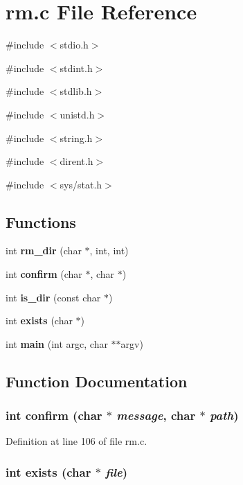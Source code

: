 \section{rm.c File Reference}
\label{rm_8c}
{\ttfamily \#include $<$stdio.h$>$}\par
{\ttfamily \#include $<$stdint.h$>$}\par
{\ttfamily \#include $<$stdlib.h$>$}\par
{\ttfamily \#include $<$unistd.h$>$}\par
{\ttfamily \#include $<$string.h$>$}\par
{\ttfamily \#include $<$dirent.h$>$}\par
{\ttfamily \#include $<$sys/stat.h$>$}\par
\subsection*{Functions}
\begin{DoxyCompactItemize}
\item 
int {\bf rm\_\-dir} (char $\ast$, int, int)
\item 
int {\bf confirm} (char $\ast$, char $\ast$)
\item 
int {\bf is\_\-dir} (const char $\ast$)
\item 
int {\bf exists} (char $\ast$)
\item 
int {\bf main} (int argc, char $\ast$$\ast$argv)
\end{DoxyCompactItemize}


\subsection{Function Documentation}
\subsubsection[{confirm}]{\setlength{\rightskip}{0pt plus 5cm}int confirm (char $\ast$ {\em message}, \/  char $\ast$ {\em path})}\label{rm_8c_a9ef1dd18b9d9e57d2ca84b42718b979e}


Definition at line 106 of file rm.c.

\subsubsection[{exists}]{\setlength{\rightskip}{0pt plus 5cm}int exists (char $\ast$ {\em file})}\label{rm_8c_a436bca6fd78f0ec6e0b6a304affe17e6}


